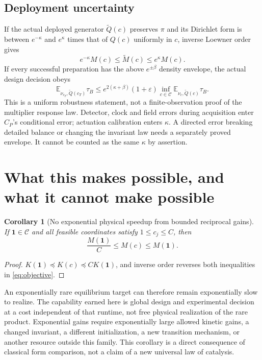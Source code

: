 \documentclass[11pt]{article}
\newtheorem{corollary}[theorem]{Corollary}
\newcommand{\E}{\mathbb E}
\newcommand{\one}{\mathbf1}
\newcommand{\calC}{\mathcal C}
\begin{document}
\subsection{Deployment uncertainty}
If the actual deployed generator $\widetilde Q(c)$ preserves $\pi$ and
its Dirichlet form is between $e^{-\kappa}$ and $e^\kappa$ times that
of $Q(c)$ uniformly in $c$, inverse Loewner order gives
\[
 e^{-\kappa}M(c)\le\widetilde M(c)\le e^\kappa M(c).
\]
If every successful preparation has the above $e^{\pm\beta}$ density
envelope, the actual design decision obeys
\[
 \E_{\nu_{c_T},\widetilde Q(c_T)}\tau_B
 \le e^{2(\kappa+\beta)}(1+\varepsilon)
   \inf_{c\in\calC}\E_{\nu_c,\widetilde Q(c)}\tau_B.
\]
This is a uniform robustness statement, not a finite-observation proof
of the multiplier response law. Detector, clock and field errors during
acquisition enter $C_P$'s conditional error; actuation calibration enters
$\kappa$. A directed error breaking detailed balance or changing the
invariant law needs a separately proved envelope. It cannot be counted
as the same $\kappa$ by assertion.

\section{What this makes possible, and what it cannot make possible}
\begin{corollary}[No exponential physical speedup from bounded reciprocal gains]
If $\one\in\calC$ and all feasible coordinates satisfy $1\le c_j\le C$,
then
\[
 \frac{M(\one)}C\le M(c)\le M(\one).
\]
\end{corollary}
\begin{proof}
$K(\one)\preceq K(c)\preceq C K(\one)$, and inverse order reverses
both inequalities in \eqref{eq:objective}.
\end{proof}
An exponentially rare equilibrium target can therefore remain
exponentially slow to realize. The capability earned here is global
design and experimental decision at a cost independent of that runtime,
not free physical realization of the rare product. Exponential gains
require exponentially large allowed kinetic gains, a changed invariant,
a different initialization, a new transition mechanism, or another
resource outside this family. This corollary is a direct consequence of
classical form comparison, not a claim of a new universal law of
catalysis.
\end{document}
